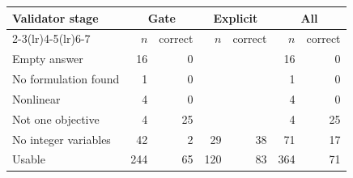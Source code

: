 \begin{tabular}{lrrrrrr}
\toprule
Validator stage & \multicolumn{2}{c}{Gate} & \multicolumn{2}{c}{Explicit} & \multicolumn{2}{c}{All} \\
\cmidrule(lr){2-3}\cmidrule(lr){4-5}\cmidrule(lr){6-7}
& $n$ & correct & $n$ & correct & $n$ & correct \\
\midrule
Empty answer & 16 & 0 &  &  & 16 & 0 \\
No formulation found & 1 & 0 &  &  & 1 & 0 \\
Nonlinear & 4 & 0 &  &  & 4 & 0 \\
Not one objective & 4 & 25 &  &  & 4 & 25 \\
No integer variables & 42 & 2 & 29 & 38 & 71 & 17 \\
Usable & 244 & 65 & 120 & 83 & 364 & 71 \\
\bottomrule
\end{tabular}
